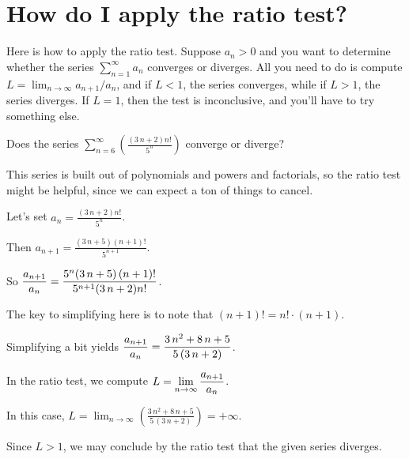\documentclass{ximera}
\begin{document}
\section{How do I apply the ratio test?}

Here is how to apply the ratio test.  Suppose \(a_n > 0\) and you want to determine whether the series \(\sum_{n=1}^\infty a_n\) converges or diverges.  All you need to do is compute \(L = \displaystyle\lim_{n\to\infty} a_{n+1}/a_n\), and if \(L < 1\), the series converges, while if \(L > 1\), the series diverges.  If \(L = 1\), then the test is inconclusive, and you'll have to try something else.

\begin{question}
  Does the series \(\displaystyle\sum_{n=6}^\infty \left( \displaystyle\frac{{\left(3 \, n + 2\right)} n!}{5^{n}} \right)\) converge or diverge?

  \begin{solution}
    \begin{hint}
      This series is built out of polynomials and powers and factorials, so the ratio test might be helpful, since we can expect a ton of things to cancel.
    \end{hint}
    \begin{hint}
      Let's set \(a_n = \displaystyle\frac{{\left(3 \, n + 2\right)} n!}{5^{n}}\).
    \end{hint}
    \begin{hint}
      Then \(a_{n+1} = \displaystyle\frac{{\left(3 \, n + 5\right)} \left(n + 1\right)!}{5^{n + 1}}\).
    \end{hint}
    \begin{hint}
      So \(\displaystyle\displaystyle\frac{a_{n+1}}{a_n} = \displaystyle\frac{5^{n} {\left(3 \, n + 5\right)} \left(n + 1\right)!}{5^{n + 1} {\left(3 \, n + 2\right)} n!}\).
    \end{hint}
    \begin{hint}
      The key to simplifying here is to note that \(\left(n + 1\right)! = n! \cdot (n + 1)\).
    \end{hint}
    \begin{hint}
      Simplifying a bit yields \(\displaystyle\displaystyle\frac{a_{n+1}}{a_n} = \displaystyle\frac{3 \, n^{2} + 8 \, n + 5}{5 \, {\left(3 \, n + 2\right)}}\).
    \end{hint}
    \begin{hint}
      In the ratio test, we compute \(L = \displaystyle\lim_{n \to \infty} \displaystyle\displaystyle\frac{a_{n+1}}{a_n}\).
    \end{hint}
    \begin{hint}
      In this case, \(L = \displaystyle\lim_{n \to \infty} \left( \displaystyle\frac{3 \, n^{2} + 8 \, n + 5}{5 \, {\left(3 \, n + 2\right)}} \right) = +\infty\).
    \end{hint}
    \begin{hint}
      Since \(L > 1\), we may conclude by the ratio test that the given series diverges.
      

\end{hint}
\end{solution}
\end{question}
\end{document}
